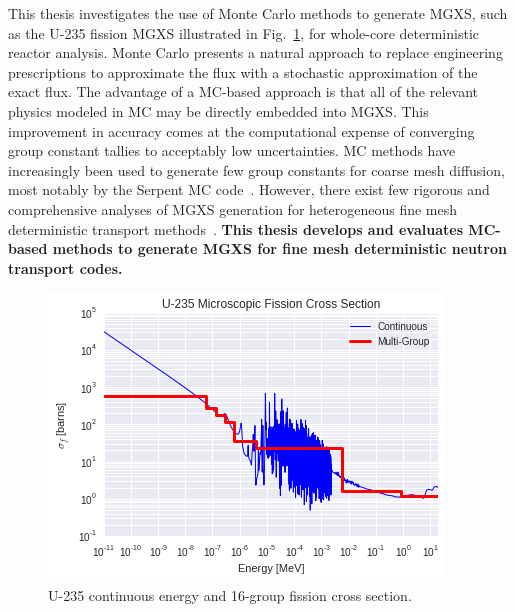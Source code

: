 \documentclass[12pt,twoside]{mitthesis-exec}
\begin{document}


This thesis investigates the use of Monte Carlo methods to generate MGXS, such as the U-235 fission MGXS illustrated in Fig.~\ref{fig:u235-sigf}, for whole-core deterministic reactor analysis. Monte Carlo presents a natural approach to replace engineering prescriptions to approximate the flux with a stochastic approximation of the exact flux. The advantage of a MC-based approach is that all of the relevant physics modeled in MC may be directly embedded into MGXS. This improvement in accuracy comes at the computational expense of converging group constant tallies to acceptably low uncertainties. MC methods have increasingly been used to generate few group constants for coarse mesh diffusion, most notably by the Serpent MC code~\cite{serpent2013manual}. However, there exist few rigorous and comprehensive analyses of MGXS generation for heterogeneous fine mesh deterministic transport methods~\cite{redmond1997multigroup,cai2014condensation,nelson2014improved}. \textbf{This thesis develops and evaluates MC-based methods to generate MGXS for fine mesh deterministic neutron transport codes.}

\begin{figure}[h!]
\centering
\includegraphics[width=0.65\linewidth]{figures/intro/u235-ce-mg-xs}
\caption[U-235 continuous energy and multi-group fission cross section]{U-235 continuous energy and 16-group fission cross section.}
\label{fig:u235-sigf}
\end{figure}
\end{document}
